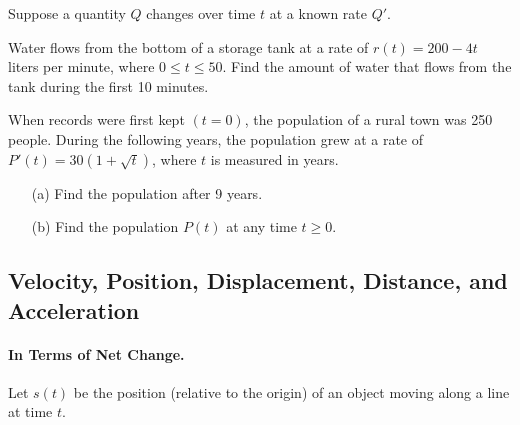 \documentclass[12pt]{article}
\begin{document}
Suppose a quantity $Q$ changes over time $t$ at a known rate $Q'$.\\


\vspace{5mm}


\newpage

\Example Water flows from the bottom of a storage tank at a rate of $r(t)=200-4t$ liters per minute, where $0\leq t\leq 50$. Find the amount of water that flows from the tank during the first 10 minutes.

\vspace{60mm}

\Example When records were first kept $(t=0)$, the population of a rural town was 250 people. During the following years, the population grew at a rate of $P'(t)=30\left(1+\sqrt{t}\right)$, where $t$ is measured in years.

\begin{enumerate}
\item[(a)] Find the population after 9 years.

\vspace{70mm}

\item[(b)] Find the population $P(t)$ at any time $t\geq 0$.
\end{enumerate}

\newpage

\subsection*{Velocity, Position, Displacement, Distance, and Acceleration}

\paragraph{In Terms of Net Change.} Let $s(t)$ be the position (relative to the origin) of an object moving along a line at time $t$.\\
\end{document}
